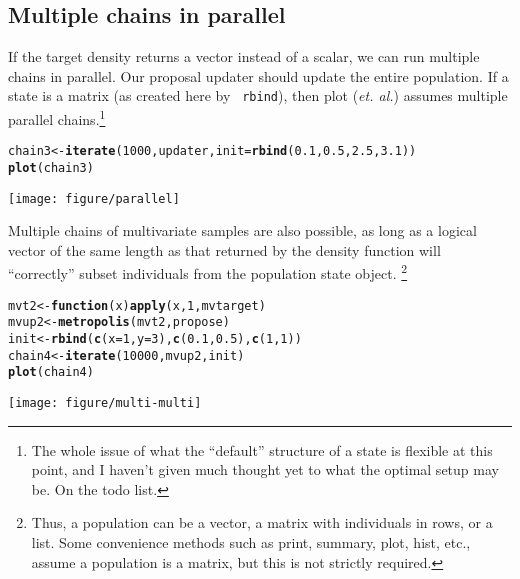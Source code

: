 \documentclass{article}\usepackage[]{graphicx}\usepackage[]{color}
\makeatletter
\def\maxwidth{ %
  \ifdim\Gin@nat@width>\linewidth
    \linewidth
  \else
    \Gin@nat@width
  \fi
}
\newcommand{\hlnum}[1]{\textcolor[rgb]{0.686,0.059,0.569}{#1}}%
\newcommand{\hlstd}[1]{\textcolor[rgb]{0.345,0.345,0.345}{#1}}%
\newcommand{\hlkwa}[1]{\textcolor[rgb]{0.161,0.373,0.58}{\textbf{#1}}}%
\newcommand{\hlkwb}[1]{\textcolor[rgb]{0.69,0.353,0.396}{#1}}%
\newcommand{\hlkwc}[1]{\textcolor[rgb]{0.333,0.667,0.333}{#1}}%
\newcommand{\hlkwd}[1]{\textcolor[rgb]{0.737,0.353,0.396}{\textbf{#1}}}%
\newenvironment{kframe}{%
 \def\at@end@of@kframe{}%
 \ifinner\ifhmode%
  \def\at@end@of@kframe{\end{minipage}}%
  \begin{minipage}{\columnwidth}%
 \fi\fi%
 \def\FrameCommand##1{\hskip\@totalleftmargin \hskip-\fboxsep
 \colorbox{shadecolor}{##1}\hskip-\fboxsep
     \hskip-\linewidth \hskip-\@totalleftmargin \hskip\columnwidth}%
 \MakeFramed {\advance\hsize-\width
   \@totalleftmargin\z@ \linewidth\hsize
   \@setminipage}}%
 {\par\unskip\endMakeFramed%
 \at@end@of@kframe}
\newenvironment{knitrout}{}{} %
\makeatother
\begin{document}
\subsection{Multiple chains in parallel}
If the target density returns a vector instead of a scalar, we can run
multiple chains in parallel. Our proposal updater should update the
entire population. If a state is a matrix (as created here by {\tt
  rbind}), then plot ({\it et. al.}) assumes multiple parallel
chains.\footnote{The whole issue of what the ``default'' structure of
  a state is flexible at this point, and I haven't given much
  thought yet to what the optimal setup may be. On the todo list.}
\begin{knitrout}
\color{fgcolor}\begin{kframe}
\begin{alltt}
\hlstd{chain3} \hlkwb{<-} \hlkwd{iterate}\hlstd{(}\hlnum{1000}\hlstd{, updater,} \hlkwc{init} \hlstd{=} \hlkwd{rbind}\hlstd{(}\hlnum{0.1}\hlstd{,} \hlnum{0.5}\hlstd{,} \hlnum{2.5}\hlstd{,} \hlnum{3.1}\hlstd{))}
\hlkwd{plot}\hlstd{(chain3)}
\end{alltt}
\end{kframe}
\texttt{[image: figure/parallel]} 

\end{knitrout}


Multiple chains of multivariate samples are also possible, as long as
a logical vector of the same length as that returned by the density
function will ``correctly'' subset individuals from the population
state object. \footnote{Thus, a population can be a vector, a matrix with
individuals in rows, or a list. Some convenience methods such as
print, summary, plot, hist, etc., assume a population is a matrix, but
this is not strictly required.}
\begin{knitrout}
\color{fgcolor}\begin{kframe}
\begin{alltt}
\hlstd{mvt2} \hlkwb{<-} \hlkwa{function}\hlstd{(}\hlkwc{x}\hlstd{)} \hlkwd{apply}\hlstd{(x,} \hlnum{1}\hlstd{, mvtarget)}
\hlstd{mvup2} \hlkwb{<-} \hlkwd{metropolis}\hlstd{(mvt2, propose)}
\hlstd{init} \hlkwb{<-} \hlkwd{rbind}\hlstd{(}\hlkwd{c}\hlstd{(}\hlkwc{x} \hlstd{=} \hlnum{1}\hlstd{,} \hlkwc{y} \hlstd{=} \hlnum{3}\hlstd{),} \hlkwd{c}\hlstd{(}\hlnum{0.1}\hlstd{,} \hlnum{0.5}\hlstd{),} \hlkwd{c}\hlstd{(}\hlnum{1}\hlstd{,} \hlnum{1}\hlstd{))}
\hlstd{chain4} \hlkwb{<-} \hlkwd{iterate}\hlstd{(}\hlnum{10000}\hlstd{, mvup2, init)}
\hlkwd{plot}\hlstd{(chain4)}
\end{alltt}
\end{kframe}
\texttt{[image: figure/multi-multi]} 

\end{knitrout}
\end{document}
